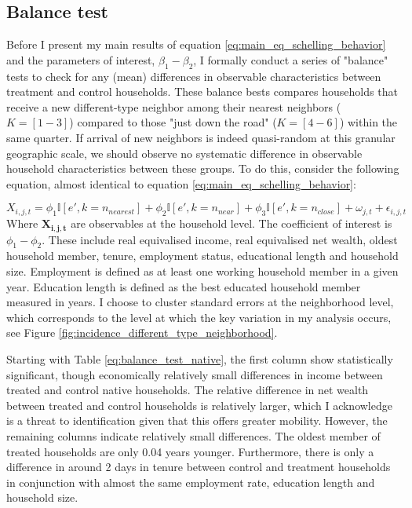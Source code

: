\documentclass[main.tex]{subfiles}
\begin{document}
\subsection{Balance test}
Before I present my main results of equation \ref{eq:main_eq_schelling_behavior} and the parameters of interest, $\beta_1-\beta_2$, I formally conduct a series of "balance" tests to check for any (mean) differences in observable characteristics between treatment and control households. These balance bests compares households that receive a new different-type neighbor among their nearest neighbors ($K=[1-3]$) compared to those "just down the road" ($K=[4-6]$) within the same quarter. If arrival of new neighbors is indeed quasi-random at this granular geographic scale, we should observe no systematic difference in observable household characteristics between these groups. To do this, consider the following equation, almost identical to equation \ref{eq:main_eq_schelling_behavior}:

\begin{equation}
    X_{i, j, t} = \phi_1 \mathbb{I}[e', k=n_{nearest}] + \phi_2 \mathbb{I}[e', k = n_{near}] + \phi_3 \mathbb{I}[e', k = n_{close}] + \omega_{j, t} + \epsilon_{i, j, t} 
    \label{eq:balance_tests}
\end{equation}
Where $\mathbf{X_{i,j,t}}$ are observables at the household level. The coefficient of interest is $\phi_1 - \phi_2$. These include real equivalised income, real equivalised net wealth, oldest household member, tenure, employment status, educational length and household size. Employment is defined as at least one working household member in a given year. Education length is defined as the best educated household member measured in years. I choose to cluster standard errors at the neighborhood level, which corresponds to the level at which the key variation in my analysis occurs, see Figure \ref{fig:incidence_different_type_neighborhood}. 

Starting with Table \ref{eq:balance_test_native}, the first column show statistically significant, though economically relatively small differences in income between treated and control native households. The relative difference in net wealth between treated and control households is relatively larger, which I acknowledge is a threat to identification given that this offers greater mobility. However, the remaining columns indicate relatively small differences. The oldest member of treated households are only 0.04 years younger. Furthermore, there is only a difference in around 2 days in tenure between control and treatment households in conjunction with almost the same employment rate, education length and household size. 
\end{document}
